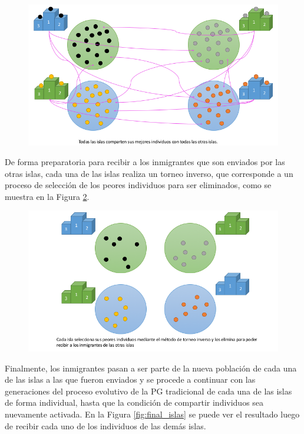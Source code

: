 \begin{figure}[H]
    \centering
    \includegraphics[width=14cm]{images/cap3/envio_todos.png}
    \label{fig:envio_todos}
\end{figure}

De forma preparatoria para recibir a los inmigrantes que son enviados por las otras islas, cada una de las islas realiza un torneo inverso, que corresponde a un proceso de selección de los peores individuos para ser eliminados, como se muestra en la Figura \ref{fig:eliminados}.

\begin{figure}[H]
    \centering
    \includegraphics[width=14cm]{images/cap3/eliminados.png}
    \label{fig:eliminados}
\end{figure}

Finalmente, los inmigrantes pasan a ser parte de la nueva población de cada una de las islas a las que fueron enviados y se procede a continuar con las generaciones del proceso evolutivo de la PG tradicional de cada una de las islas de forma individual, hasta que la condición de compartir individuos sea nuevamente activada. En la Figura \ref{fig:final_islas} se puede ver el resultado luego de recibir cada uno de los individuos de las demás islas.


